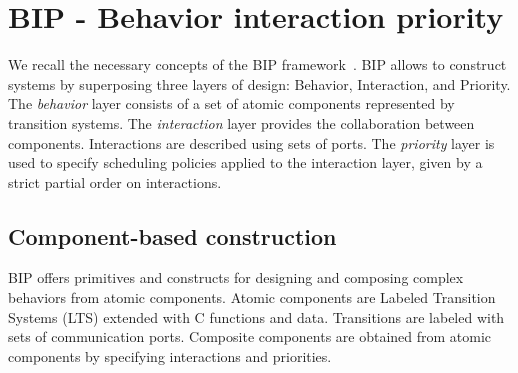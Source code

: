 \section{BIP - Behavior interaction priority}
\label{sec:bip}
%
We recall the necessary concepts of the BIP framework~\cite{bip11}.
BIP allows to construct systems by superposing three layers of design: Behavior, Interaction, and Priority.
The \emph{behavior} layer consists of a set of atomic components represented by transition systems. 
The \emph{interaction} layer provides the collaboration between components. 
Interactions are described using sets of ports. 
The \emph{priority} layer is used to specify scheduling policies applied to the interaction layer, given by a strict partial order on interactions.
%
\subsection{Component-based construction}
%
BIP offers primitives and constructs for designing and composing complex behaviors from atomic components. Atomic components are Labeled Transition Systems (LTS) extended with C functions and data. Transitions are labeled with sets of communication ports. 
Composite components are obtained from atomic components by specifying interactions and priorities.
%
%

